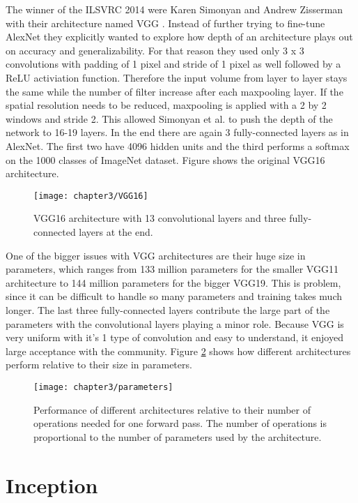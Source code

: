 The winner of the ILSVRC 2014 were Karen Simonyan and Andrew Zisserman with their architecture named VGG \cite{simonyan2014very}. Instead of further trying to fine-tune AlexNet they explicitly wanted to explore how depth of an architecture plays out on accuracy and generalizability. For that reason they used only 3 x 3 convolutions with padding of 1 pixel and stride of 1 pixel as well followed by a ReLU activiation function. Therefore the input volume from layer to layer stays the same while the number of filter increase after each maxpooling layer. If the spatial resolution needs to be reduced, maxpooling is applied with a 2 by 2 windows and stride 2. This allowed Simonyan et al. to push the depth of the network to 16-19 layers. In the end there are again 3 fully-connected layers as in AlexNet. The first two have 4096 hidden units and the third performs a softmax on the 1000 classes of ImageNet dataset. Figure shows the original VGG16 architecture.

\begin{figure}[H]
  \centering
  \caption{VGG16 architecture with 13 convolutional layers and three fully-connected layers at the end. \cite{ferguson2017automatic}}
  \texttt{[image: chapter3/VGG16]}
  \label{fig:vgg16}
\end{figure}

One of the bigger issues with VGG architectures are their huge size in parameters, which ranges from 133 million parameters for the smaller VGG11 architecture to 144 million parameters for the bigger VGG19. This is problem, since it can be difficult to handle so many parameters and training takes much longer. The last three fully-connected layers contribute the large part of the parameters with the convolutional layers playing a minor role. Because VGG is very uniform with it's 1 type of convolution and easy to understand, it enjoyed large acceptance with the community. Figure \ref{fig:parameters} shows how different architectures perform relative to their size in parameters.

\begin{figure}[H]
  \centering
  \caption{Performance of different architectures relative to their number of operations needed for one forward pass. The number of operations is proportional to the number of parameters used by the architecture. \cite{canziani2016analysis}}
  \texttt{[image: chapter3/parameters]}
  \label{fig:parameters}
\end{figure}

\section{Inception}

